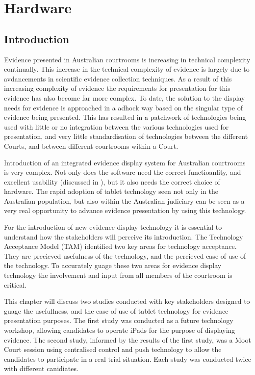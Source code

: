 \chapter{Hardware\label{chap:Hardware}}

\section{Introduction\label{Section:Hardware:Introduction}}

Evidence presented in Australian courtrooms is increasing in technical complexity continually. This increase in the technical complexity of evidence is largely due to avdancements in scientific evidence collection techniques. As a result of this increasing complexity of evidence the requirements for presentation for this evidence has also become far more complex. To date, the solution to the display needs for evidence is approached in a adhock way based on the singular type of evidence being presented. This has resulted in a patchwork of technologies being used with little or no integration between the various technologies used for presentation, and very little standardisation of technologies between the different Courts, and between different courtrooms within a Court. 

Introduction of an integrated evidence display system for Australian courtrooms is very complex. Not only does the software need the correct functioanlity, and excellent usability (discussed in  ), but it also needs the correct choice of hardware. The rapid adoption of tablet technology seen not only in the Australian population, but also within the Australian judiciary \citep{Heerboth2013} can be seen as a very real opportunity to advance evidence presentation by using this technology.

For the introduction of new evidence display technology it is essential to understand how the stakeholders will perceive its introduction. The Technology Acceptance Model (TAM) identified two key areas for technology acceptance. They are precieved usefulness of the technology, and the percieved ease of use of the technology. To accurately guage these two areas for evidence display technology the involvement and input from all members of the courtroom is critical. 

This chapter will discuss two studies conducted with key stakeholders designed to guage the usefullness, and the ease of use of tablet technology for evidence presentation purposes. The first study was conducted as a future technology workshop, allowing candidates to operate iPads for the purpose of displaying evidence. The second study, informed by the results of the first study, was a Moot Court session using centralised control and push technology to allow the candidates to participate in a real trial situation. Each study was conducted twice with different canidiates.

